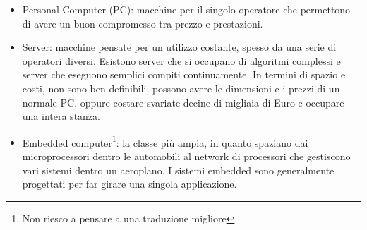 \documentclass[a4paper,12pt]{article}
\theoremstyle{break}
\numberwithin{equation}{section}
\begin{document}
\begin{itemize}
    \item Personal Computer (PC): macchine per il singolo operatore che permettono di avere un buon compromesso tra prezzo e prestazioni.
    \item Server: macchine pensate per un utilizzo costante, spesso da una serie di operatori diversi. Esistono server che si occupano di algoritmi complessi e server che eseguono semplici compiti continuamente. In termini di spazio e costi, non sono ben definibili, possono avere le dimensioni e i prezzi di un normale PC, oppure costare svariate decine di migliaia di Euro e occupare una intera stanza.
    \item Embedded computer\footnote{Non riesco a pensare a una traduzione migliore}: la classe più ampia, in quanto spaziano dai microprocessori dentro le automobili al network di processori che gestiscono vari sistemi dentro un aeroplano. I sistemi embedded sono generalmente progettati per far girare una singola applicazione.
\end{itemize}
\end{document}
